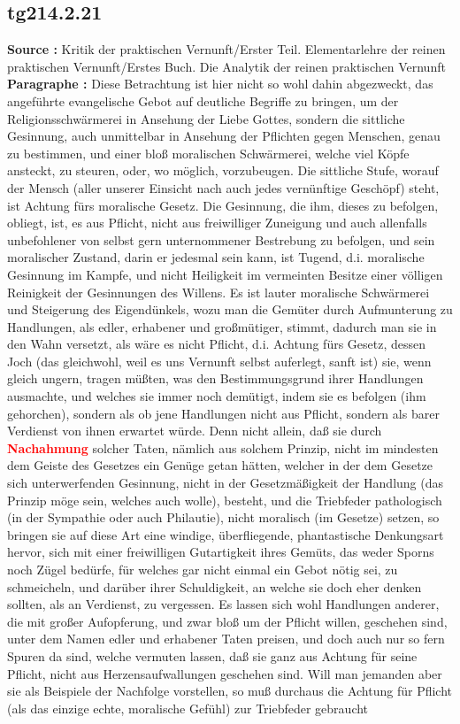 \documentclass[a4paper,12pt,twoside]{book}
\newcommand{\match}[1]{\textcolor{red}{\textbf{#1}}}
\begin{document}
	\subsection*{tg214.2.21} 
	\textbf{Source : }Kritik der praktischen Vernunft/Erster Teil. Elementarlehre der reinen praktischen Vernunft/Erstes Buch. Die Analytik der reinen praktischen Vernunft\\  
	
	\noindent\textbf{Paragraphe : }
	Diese Betrachtung ist hier nicht so wohl dahin abgezweckt, das angeführte evangelische Gebot auf deutliche Begriffe zu bringen, um der Religionsschwärmerei in Ansehung der Liebe Gottes, sondern die sittliche Gesinnung, auch unmittelbar in Ansehung der Pflichten gegen Menschen, genau zu bestimmen, und einer bloß moralischen Schwärmerei, welche viel Köpfe ansteckt, zu steuren, oder, wo möglich, vorzubeugen. Die sittliche Stufe, worauf der Mensch (aller unserer Einsicht nach auch jedes vernünftige Geschöpf) steht, ist Achtung fürs moralische Gesetz. Die Gesinnung, die ihm, dieses zu befolgen, obliegt, ist, es aus Pflicht, nicht aus freiwilliger Zuneigung und auch allenfalls unbefohlener von selbst gern unternommener Bestrebung zu befolgen, und sein moralischer Zustand, darin er jedesmal sein kann, ist Tugend, d.i. moralische Gesinnung im Kampfe, und nicht Heiligkeit im vermeinten Besitze einer völligen Reinigkeit der Gesinnungen des Willens. Es ist lauter moralische Schwärmerei und Steigerung des Eigendünkels, wozu man die Gemüter durch Aufmunterung zu Handlungen, als edler, erhabener und großmütiger, stimmt, dadurch man sie in den Wahn versetzt, als wäre es nicht Pflicht, d.i. Achtung fürs Gesetz, dessen Joch (das gleichwohl, weil es uns Vernunft selbst auferlegt, sanft ist) sie, wenn gleich ungern, tragen müßten, was den Bestimmungsgrund ihrer Handlungen ausmachte, und welches sie immer noch demütigt, indem sie es befolgen (ihm gehorchen), sondern als ob jene Handlungen nicht aus Pflicht, sondern als barer Verdienst von ihnen erwartet würde. Denn nicht allein, daß sie durch \match{Nachahmung} solcher Taten, nämlich aus solchem Prinzip, nicht im mindesten dem Geiste des Gesetzes ein Genüge getan hätten, welcher in der dem Gesetze sich unterwerfenden Gesinnung, nicht in der Gesetzmäßigkeit der Handlung (das Prinzip möge sein, welches auch wolle), besteht, und die Triebfeder pathologisch (in der Sympathie oder auch Philautie), nicht moralisch (im Gesetze) setzen, so bringen sie auf diese Art eine windige, überfliegende, phantastische Denkungsart hervor, sich mit  einer freiwilligen Gutartigkeit ihres Gemüts, das weder Sporns noch Zügel bedürfe, für welches gar nicht einmal ein Gebot nötig sei, zu schmeicheln, und darüber ihrer Schuldigkeit, an welche sie doch eher denken sollten, als an Verdienst, zu vergessen. Es lassen sich wohl Handlungen anderer, die mit großer Aufopferung, und zwar bloß um der Pflicht willen, geschehen sind, unter dem Namen edler und erhabener Taten preisen, und doch auch nur so fern Spuren da sind, welche vermuten lassen, daß sie ganz aus Achtung für seine Pflicht, nicht aus Herzensaufwallungen geschehen sind. Will man jemanden aber sie als Beispiele der Nachfolge vorstellen, so muß durchaus die Achtung für Pflicht (als das einzige echte, moralische Gefühl) zur Triebfeder gebraucht 
\end{document}
